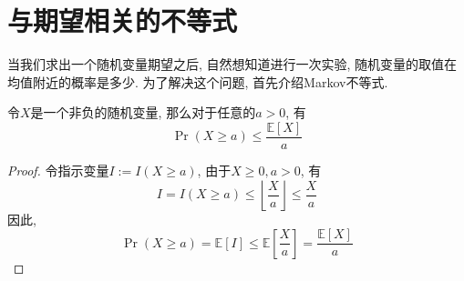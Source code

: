 \documentclass{ctexart}
\begin{document}
\section{与期望相关的不等式}

当我们求出一个随机变量期望之后, 自然想知道进行一次实验, 随机变量的取值在均值附近的概率是多少. 为了解决这个问题, 首先介绍Markov不等式. 

\begin{theorem}[Markov不等式]
    令$X$是一个非负的随机变量, 那么对于任意的$a>0$, 有
$$
\operatorname{Pr}(X \geq a) \leq \frac{\mathbb{E}[X]}{a}
$$

\end{theorem}

\begin{proof}
    令指示变量$I:=I(X\geq a)$, 由于$X\geq 0, a>0$, 有
    $$
I=I(X \geq a) \leq\left\lfloor\frac{X}{a}\right\rfloor \leq \frac{X}{a}
$$
因此, 
$$
\operatorname{Pr}(X \geq a)=\mathbb{E}[I] \leq \mathbb{E}\left[\frac{X}{a}\right]=\frac{\mathbb{E}[X]}{a}
$$
\end{proof}
    
\end{document}
